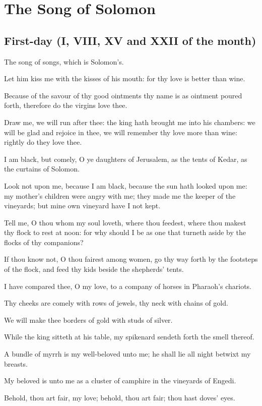 \chapter{The Song of Solomon}

\section*{First-day (I, VIII, XV and XXII of the month)}

The song of songs, which is Solomon's.

Let him kiss me with the kisses of his mouth: for thy love is better than wine.

Because of the savour of thy good ointments thy name is as ointment poured forth, therefore do the virgins love thee.

 Draw me, we will run after thee: the king hath brought me into his chambers: we will be glad and rejoice in thee, we will remember thy love more than wine: rightly do they love thee.

I am black, but comely, O ye daughters of Jerusalem, as the tents of Kedar, as the curtains of Solomon.

Look not upon me, because I am black, because the sun hath looked upon me: my mother's children were angry with me; they made me the keeper of the vineyards; but mine own vineyard have I not kept.

Tell me, O thou whom my soul loveth, where thou feedest, where thou makest thy flock to rest at noon: for why should I be as one that turneth aside by the flocks of thy companions?

If thou know not, O thou fairest among women, go thy way forth by the footsteps of the flock, and feed thy kids beside the shepherds' tents.

I have compared thee, O my love, to a company of horses in Pharaoh's chariots.

Thy cheeks are comely with rows of jewels, thy neck with chains of gold.

We will make thee borders of gold with studs of silver.

While the king sitteth at his table, my spikenard sendeth forth the smell thereof.

A bundle of myrrh is my well-beloved unto me; he shall lie all night betwixt my breasts.

My beloved is unto me as a cluster of camphire in the vineyards of Engedi.

Behold, thou art fair, my love; behold, thou art fair; thou hast doves' eyes.

